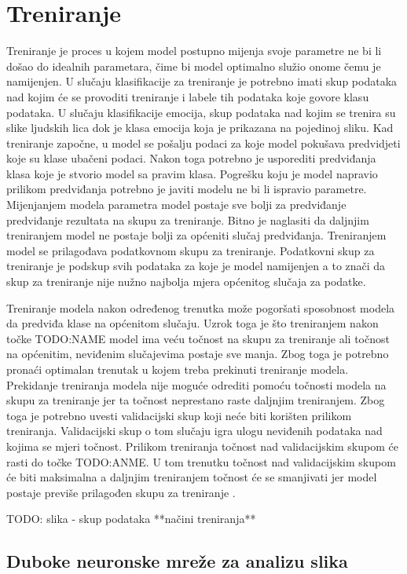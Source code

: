 \documentclass[times, utf8, zavrsni,numeric,pstricks]{fer}
\begin{document}
\chapter{Treniranje}
Treniranje je proces u kojem model postupno mijenja svoje parametre ne bi li došao do idealnih parametara, čime bi model optimalno služio onome čemu je namijenjen. U slučaju klasifikacije za treniranje je potrebno imati skup podataka nad kojim će se provoditi treniranje i labele tih podataka koje govore klasu podataka. U slučaju klasifikacije emocija, skup podataka nad kojim se trenira su slike ljudskih lica dok je klasa emocija koja je prikazana na pojedinoj sliku. Kad treniranje započne, u model se pošalju podaci za koje model pokušava predvidjeti koje su klase ubačeni podaci. Nakon toga potrebno je usporediti predviđanja klasa koje je stvorio model sa pravim klasa. Pogrešku koju je model napravio prilikom predviđanja potrebno je javiti modelu ne bi li ispravio parametre. Mijenjanjem modela parametra model postaje sve bolji za predviđanje predviđanje rezultata na skupu za treniranje. Bitno je naglasiti da daljnjim treniranjem model ne postaje bolji za općeniti slučaj predviđanja. Treniranjem model se prilagođava podatkovnom skupu za treniranje. Podatkovni skup za treniranje je podskup svih podataka za koje je model namijenjen a to znači da skup za treniranje nije nužno najbolja mjera općenitog slučaja za podatke. 


Treniranje modela nakon određenog trenutka može pogoršati sposobnost modela da predviđa klase na općenitom slučaju. Uzrok toga je što treniranjem nakon točke TODO:NAME model ima veću točnost na skupu za treniranje ali točnost na općenitim, neviđenim slučajevima postaje sve manja. Zbog toga je potrebno pronaći optimalan trenutak u kojem treba prekinuti treniranje modela. Prekidanje treniranja modela nije moguće odrediti pomoću točnosti modela na skupu za treniranje jer ta točnost neprestano raste daljnjim treniranjem. Zbog toga je potrebno uvesti validacijski skup koji neće biti korišten prilikom treniranja. Validacijski skup o tom slučaju igra ulogu neviđenih podataka nad kojima se mjeri točnost. Prilikom treniranja točnost nad validacijskim skupom će rasti do točke TODO:ANME. U tom trenutku točnost nad validacijskim skupom će biti maksimalna a daljnjim treniranjem točnost će se smanjivati jer model postaje previše prilagođen skupu za treniranje . 

TODO: slika - skup podataka  
**načini treniranja**

\section{Duboke neuronske mreže za analizu slika}
\end{document}
